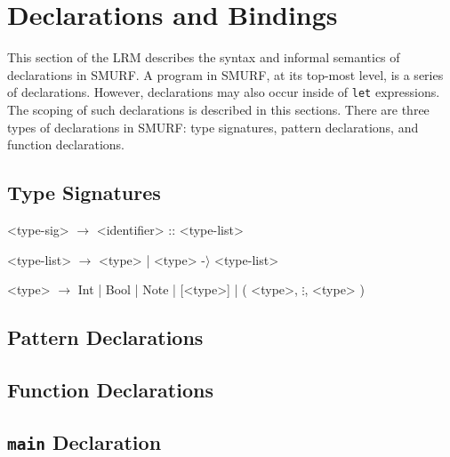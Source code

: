 \section{Declarations and Bindings}

This section of the LRM describes the syntax and informal semantics of
declarations in SMURF. A program in SMURF, at its top-most level, is a
series of declarations. However, declarations may also occur inside of
\texttt{let} expressions. The scoping of such declarations is described 
in this sections. There are three types of declarations in SMURF: 
type signatures, pattern declarations, and function declarations.

\subsection{Type Signatures}

\begin{grammar}

<type-sig> $\rightarrow$ <identifier> :: <type-list>

<type-list> $\rightarrow$ <type> | <type> -$\rangle$ <type-list>

<type> $\rightarrow$ Int | Bool | Note | [<type>] | 
										( <type>, $\vdots$, <type> )
										

\end{grammar}

\subsection{Pattern Declarations}

\subsection{Function Declarations}

\subsection{\texttt{main} Declaration}
